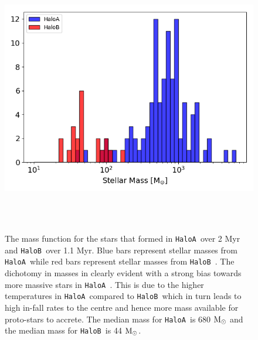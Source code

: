 \documentclass[graphics, twocolumn, usenatbib]{mn2e}
\newcommand{\msolar} {$\rm{M_{\odot}}~$}
\newcommand{\msolarc} {$\rm{M_{\odot}}$}
\newcommand{\ha} {\texttt{HaloA~}}
\newcommand{\hb} {\texttt{HaloB~}}
\begin{document}
\begin{figure}
\centering
\begin{minipage}{175mm}      \begin{center}
\centerline{
    \includegraphics[width=18.0cm, height=12cm]{FIGURES/FinalMass_MultipleHaloes.png}}
\caption{
  The mass function for the stars that formed in \ha over 2 Myr and \hb over 1.1 Myr.
  Blue bars represent stellar masses from \ha while red bars represent stellar masses from \hb.
  The dichotomy in masses in clearly evident with a strong bias towards more massive stars
  in \ha. This is due to the higher temperatures in \ha compared to \hb which in turn
  leads to high in-fall rates to the centre and hence more mass available for proto-stars
  to accrete. The median mass for \ha is 680 \msolar and the median mass for \hb is 44 \msolarc. 
}
\label{Fig:MassFunction}
\end{center} \end{minipage}
\end{figure}
\end{document}
